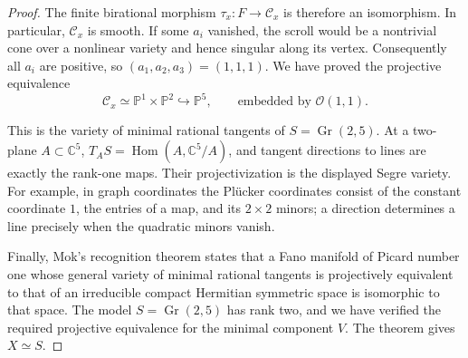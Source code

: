 \begin{proof}
The finite birational morphism $\tau_x\colon F\to\mathcal C_x$ is
therefore an isomorphism.  In particular, $\mathcal C_x$ is smooth.
If some $a_i$ vanished, the scroll would be a nontrivial cone over a
nonlinear variety and hence singular along its vertex.  Consequently
all $a_i$ are positive, so $(a_1,a_2,a_3)=(1,1,1)$.  We have proved
the projective equivalence
\[
 \mathcal C_x\simeq
 \mathbb P^1\times\mathbb P^2\hookrightarrow\mathbb P^5,
 \qquad\text{embedded by }\mathcal O(1,1).
\]

This is the variety of minimal rational tangents of
$S=\operatorname{Gr}(2,5)$.  At a two-plane $A\subset\mathbb C^5$,
$T_AS=\operatorname{Hom}(A,\mathbb C^5/A)$, and tangent directions
to lines are exactly the rank-one maps.  Their projectivization is
the displayed Segre variety.  For example, in graph coordinates the
Pl\"ucker coordinates consist of the constant coordinate $1$, the entries of a map, and its
$2\times2$ minors; a direction determines a line precisely when the
quadratic minors vanish.

Finally, Mok's recognition theorem
\cite[Main Theorem, \S2.1]{Mok2008Recognition} states that a Fano
manifold of Picard number one whose general variety of minimal
rational tangents is projectively equivalent to that of an irreducible
compact Hermitian symmetric space is isomorphic to that space.
The model $S=\operatorname{Gr}(2,5)$ has rank two, and we have
verified the required projective equivalence for the minimal component
$V$.  The theorem gives $X\simeq S$.
\end{proof}
